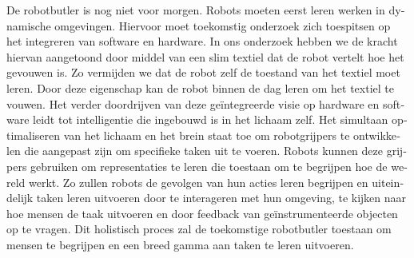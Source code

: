 \documentclass[\home/main.tex]{subfiles}
\begin{document}
\begin{otherlanguage}{dutch}
De robotbutler is nog niet voor morgen. Robots moeten eerst leren werken in dynamische omgevingen. Hiervoor moet toekomstig onderzoek zich toespitsen op het integreren van software en hardware. In ons onderzoek hebben we de kracht hiervan aangetoond door middel van een slim textiel dat de robot vertelt hoe het gevouwen is. Zo vermijden we dat de robot zelf de toestand van het textiel moet leren. Door deze eigenschap kan de robot binnen de dag leren om het textiel te vouwen.
Het verder doordrijven van deze geïntegreerde visie op hardware en software leidt tot intelligentie die ingebouwd is in het lichaam zelf. Het simultaan optimaliseren van het lichaam en het brein staat toe om robotgrijpers te ontwikkelen die aangepast zijn om specifieke taken uit te voeren. Robots kunnen deze grijpers gebruiken om representaties te leren die toestaan om te begrijpen hoe de wereld werkt. Zo zullen robots de gevolgen van hun acties leren begrijpen en uiteindelijk taken leren uitvoeren door te interageren met hun omgeving, te kijken naar hoe mensen de taak uitvoeren en door feedback van geïnstrumenteerde objecten op te vragen. 
Dit holistisch proces zal de toekomstige robotbutler toestaan om mensen te begrijpen en een breed gamma aan taken te leren uitvoeren. 

\end{otherlanguage}
\end{document}
